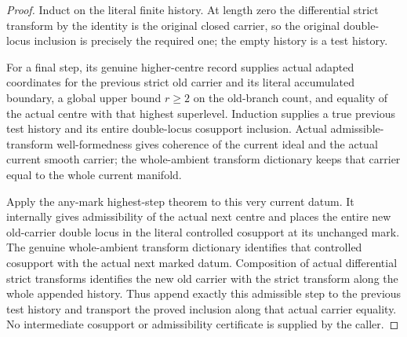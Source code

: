 \begin{proof}
Induct on the literal finite history. At length zero the differential
strict transform by the identity is the original closed carrier, so
the original double-locus inclusion is precisely the required one;
the empty history is a test history.

For a final step, its genuine higher-centre record supplies actual
adapted coordinates for the previous strict old carrier and its
literal accumulated boundary, a global upper bound $r\geq2$ on the
old-branch count, and equality of the actual centre with that highest
superlevel. Induction supplies a true previous test history and its
entire double-locus cosupport inclusion. Actual admissible-transform
well-formedness gives coherence of the current ideal and the actual
current smooth carrier; the whole-ambient transform dictionary keeps
that carrier equal to the whole current manifold.

Apply the any-mark highest-step theorem to this very current datum.
It internally gives admissibility of the actual next centre and
places the entire new old-carrier double locus in the literal
controlled cosupport at its unchanged mark. The genuine whole-ambient
transform dictionary identifies that controlled cosupport with the
actual next marked datum. Composition of actual differential strict
transforms identifies the new old carrier with the strict transform
along the whole appended history. Thus append exactly this admissible
step to the previous test history and transport the proved inclusion
along that actual carrier equality. No intermediate cosupport or
admissibility certificate is supplied by the caller.
\end{proof}

